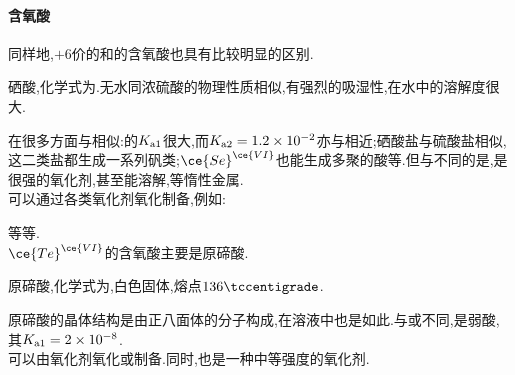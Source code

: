 \documentclass{ctexart}
\begin{document}
\paragraph{含氧酸}
同样地,$+6$价的和的含氧酸也具有比较明显的区别.
\begin{substance}[\ce{H2SeO4}]
    硒酸,化学式为.无水同浓硫酸的物理性质相似,有强烈的吸湿性,在水中的溶解度很大.
\end{substance}
在很多方面与相似:的$K_{\text a1}$很大,而$K_{\text a2}=1.2\times10^{-2}$亦与相近;硒酸盐与硫酸盐相似,这二类盐都生成一系列矾类;$\ce{Se}^{\ce{VI}}$也能生成多聚的酸等.但与不同的是,是很强的氧化剂,甚至能溶解,等惰性金属.\\
\indent 可以通过各类氧化剂氧化制备,例如:
\begin{center}
\end{center}
等等.\\
\indent $\ce{Te}^{\ce{VI}}$的含氧酸主要是原碲酸.
\begin{substance}[\ce{H6TeO6}]
    原碲酸,化学式为,白色固体,熔点$136\tccentigrade$.
\end{substance}
原碲酸的晶体结构是由正八面体的分子构成,在溶液中也是如此.与或不同,是弱酸,其$K_{\text a1}=2\times10^{-8}$.\\
\indent {}可以由氧化剂氧化或制备.同时,也是一种中等强度的氧化剂.
\end{document}
